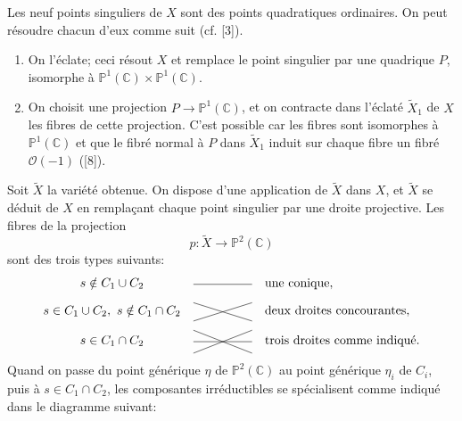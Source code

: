 \documentclass[10pt]{article}
\newcommand{\C}{\mathbb C}
\newcommand{\Pj}{\mathbb P}
\begin{document}
Les neuf points singuliers de \(X\) sont des points quadratiques ordinaires. On peut résoudre chacun d'eux comme suit (cf. [3]).
\begin{enumerate}[label=\alph*)]
\item On l'éclate; ceci résout \(X\) et remplace le point singulier par une quadrique \(P\), isomorphe à \(\Pj^1(\C)\times\Pj^1(\C)\).
\item On choisit une projection \(P\to\Pj^1(\C)\), et on contracte dans l'éclaté \(\widetilde X_1\) de \(X\) les fibres de cette projection. C'est possible car les fibres sont isomorphes à \(\Pj^1(\C)\) et que le fibré normal à \(P\) dans \(\widetilde X_1\) induit sur chaque fibre un fibré \(\mathcal O(-1)\) ([8]).
\end{enumerate}
Soit \(\widetilde X\) la variété obtenue. On dispose d'une application de \(\widetilde X\) dans \(X\), et \(\widetilde X\) se déduit de \(X\) en remplaçant chaque point singulier par une droite projective. Les fibres de la projection
\[
p:\widetilde X\longrightarrow\Pj^2(\C)
\]
sont des trois types suivants:
\[
\begin{array}{c@{\quad}c@{\quad}l}
s\notin C_1\cup C_2 &
\begin{tikzpicture}[baseline=-0.45ex,scale=0.72]
  \draw (-1.15,0)--(1.15,0);
\end{tikzpicture}
& \text{une conique},\\[0.9em]
s\in C_1\cup C_2,\ s\notin C_1\cap C_2 &
\begin{tikzpicture}[baseline=-0.45ex,scale=0.72]
  \draw (-1.15,-.36)--(1.15,.36);
  \draw (-1.15,.36)--(1.15,-.36);
\end{tikzpicture}
& \text{deux droites concourantes},\\[0.9em]
s\in C_1\cap C_2 &
\begin{tikzpicture}[baseline=-0.45ex,scale=0.72]
  \draw (-1.15,-.45)--(1.15,.45);
  \draw (-1.15,.45)--(1.15,-.45);
  \draw (-1.15,0)--(1.15,0);
\end{tikzpicture}
& \text{trois droites comme indiqué.}
\end{array}
\]
Quand on passe du point générique \(\eta\) de \(\Pj^2(\C)\) au point générique \(\eta_i\) de \(C_i\), puis à \(s\in C_1\cap C_2\), les composantes irréductibles se spécialisent comme indiqué dans le diagramme suivant:
\end{document}

